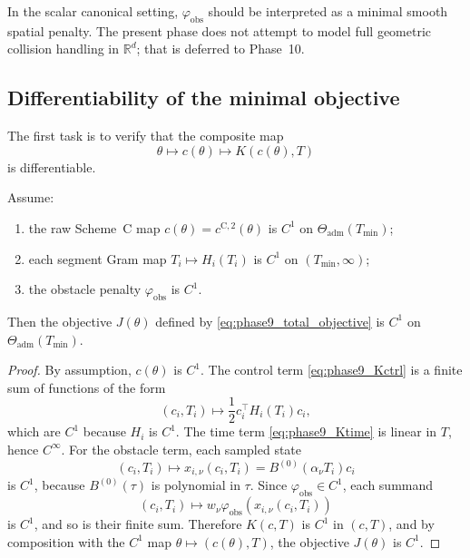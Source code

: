 \begin{remark}
\label{rem:phase9_obs_scope}
In the scalar canonical setting, \(\varphi_{\mathrm{obs}}\) should be interpreted as a minimal smooth spatial penalty.
The present phase does not attempt to model full geometric collision handling in \(\mathbb R^d\); that is deferred to Phase~10.
\end{remark}

\subsection{Differentiability of the minimal objective}
\label{subsec:phase9_diff}

The first task is to verify that the composite map
\[
\theta\mapsto c(\theta)\mapsto K(c(\theta),T)
\]
is differentiable.

\begin{proposition}
\label{prop:phase9_differentiability}
Assume:
\begin{enumerate}
    \item the raw Scheme~C map \(c(\theta)=c^{\mathrm{C},2}(\theta)\) is \(C^1\) on \(\Theta_{\mathrm{adm}}(T_{\min})\);
    \item each segment Gram map \(T_i\mapsto H_i(T_i)\) is \(C^1\) on \((T_{\min},\infty)\);
    \item the obstacle penalty \(\varphi_{\mathrm{obs}}\) is \(C^1\).
\end{enumerate}
Then the objective \(J(\theta)\) defined by \eqref{eq:phase9_total_objective} is \(C^1\) on \(\Theta_{\mathrm{adm}}(T_{\min})\).
\end{proposition}

\begin{proof}
By assumption, \(c(\theta)\) is \(C^1\).
The control term \eqref{eq:phase9_Kctrl} is a finite sum of functions of the form
\[
(c_i,T_i)\mapsto \frac12 c_i^\top H_i(T_i)c_i,
\]
which are \(C^1\) because \(H_i\) is \(C^1\).
The time term \eqref{eq:phase9_Ktime} is linear in \(T\), hence \(C^\infty\).
For the obstacle term, each sampled state
\[
(c_i,T_i)\mapsto x_{i,\nu}(c_i,T_i)=B^{(0)}(\alpha_\nu T_i)c_i
\]
is \(C^1\), because \(B^{(0)}(\tau)\) is polynomial in \(\tau\).
Since \(\varphi_{\mathrm{obs}}\in C^1\), each summand
\[
(c_i,T_i)\mapsto w_\nu\varphi_{\mathrm{obs}}(x_{i,\nu}(c_i,T_i))
\]
is \(C^1\), and so is their finite sum.
Therefore \(K(c,T)\) is \(C^1\) in \((c,T)\), and by composition with the \(C^1\) map \(\theta\mapsto(c(\theta),T)\), the objective \(J(\theta)\) is \(C^1\).
\end{proof}

